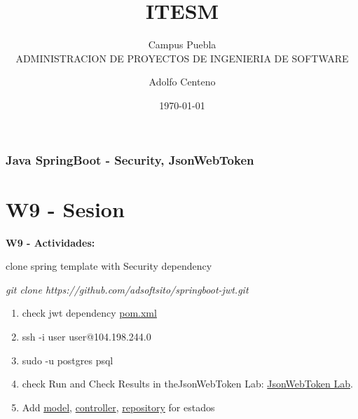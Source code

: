 \documentclass{beamer}
\begin{document}
\title{ITESM}  
\subtitle{Campus Puebla\\ADMINISTRACION DE PROYECTOS DE INGENIERIA DE SOFTWARE
}
\author{Adolfo Centeno}
\date{\today} 


\begin{frame}
\titlepage
\end{frame}

\begin{frame}\frametitle{Java SpringBoot - Security, JsonWebToken}
\tableofcontents
\end{frame} 


\section{W9 - Sesion }

\begin{frame}

    
\textbf{W9 - Actividades:}


\begin{block}{clone spring template with Security dependency}


 
    \emph{git clone https://github.com/adsoftsito/springboot-jwt.git}
\end{block}

\begin{enumerate}

\item check jwt dependency  \href{https://github.com/adsoftsito/ng5-api/blob/master/Dockerfile}{pom.xml}

\item ssh -i user user@104.198.244.0    
       
\item sudo -u postgres psql

\item
	check Run and Check Results in theJsonWebToken Lab: \href{https://grokonez.com/spring-framework/spring-boot/spring-security-jwt-authentication-postgresql-restapis-springboot-spring-mvc-spring-jpa}{JsonWebToken Lab}.	
\item
    Add  \href{https://github.com/adsoftsito/maps-api-jwt/blob/master/src/main/java/com/grokonez/jwtauthentication/model/Estado.java}{model}, \href{https://github.com/adsoftsito/maps-api-jwt/blob/master/src/main/java/com/grokonez/jwtauthentication/controller/EstadoController.java}{controller}, \href{https://github.com/adsoftsito/maps-api-jwt/blob/master/src/main/java/com/grokonez/jwtauthentication/repository/EstadoRepository.java}{repository} for estados
    

\end{enumerate}
\end{frame}
\end{document}
